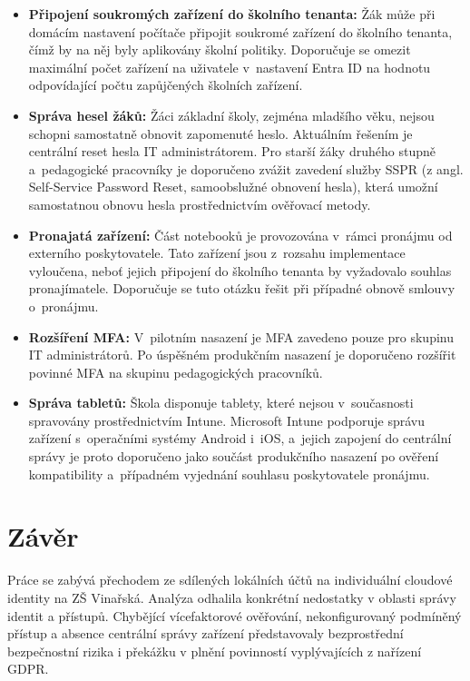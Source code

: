 \documentclass[male,czech,api_bc]{kitheses}
\begin{document}
\begin{itemize}
    \item \textbf{Připojení soukromých zařízení do školního tenanta:} 
    Žák může při domácím nastavení počítače připojit soukromé zařízení 
    do školního tenanta, čímž by na něj byly aplikovány školní politiky. 
    Doporučuje se omezit maximální počet zařízení na uživatele 
    v~nastavení Entra ID na hodnotu odpovídající počtu zapůjčených 
    školních zařízení.
    \item \textbf{Správa hesel žáků:} Žáci základní školy, zejména 
    mladšího věku, nejsou schopni samostatně obnovit zapomenuté heslo. 
    Aktuálním řešením je centrální reset hesla IT administrátorem. 
    Pro starší žáky druhého stupně a~pedagogické pracovníky je 
    doporučeno zvážit zavedení služby SSPR (z angl. Self-Service Password Reset, samoobslužné obnovení hesla), která umožní samostatnou obnovu hesla prostřednictvím 
    ověřovací metody.
    \item \textbf{Pronajatá zařízení:} Část notebooků je provozována 
    v~rámci pronájmu od externího poskytovatele. Tato zařízení jsou 
    z~rozsahu implementace vyloučena, neboť jejich připojení do školního 
    tenanta by vyžadovalo souhlas pronajímatele. Doporučuje se tuto 
    otázku řešit při případné obnově smlouvy o~pronájmu.
    \item \textbf{Rozšíření MFA:} V~pilotním nasazení je MFA zavedeno 
    pouze pro skupinu IT administrátorů. Po úspěšném produkčním 
    nasazení je doporučeno rozšířit povinné MFA na skupinu 
    pedagogických pracovníků.
    \item \textbf{Správa tabletů:} Škola disponuje tablety, které 
    nejsou v~současnosti spravovány prostřednictvím Intune. 
    Microsoft Intune podporuje správu zařízení s~operačními systémy 
    Android i~iOS, a~jejich zapojení do centrální správy je proto 
    doporučeno jako součást produkčního nasazení po ověření 
    kompatibility a~případném vyjednání souhlasu poskytovatele pronájmu.
\end{itemize}

\chapter{Závěr}
Práce se zabývá přechodem ze sdílených lokálních účtů na individuální cloudové identity na ZŠ Vinařská. Analýza odhalila konkrétní nedostatky v oblasti správy identit a přístupů. Chybějící vícefaktorové ověřování, nekonfigurovaný podmíněný přístup a absence centrální správy zařízení představovaly bezprostřední bezpečnostní rizika i překážku v plnění povinností vyplývajících z nařízení GDPR.
\end{document}
